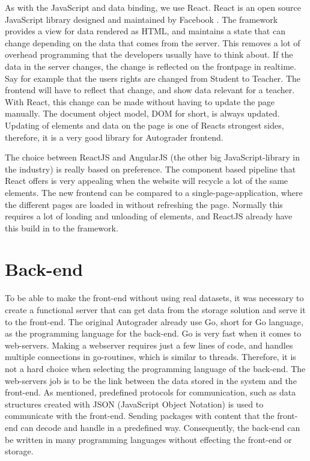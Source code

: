 As with the JavaScript and data binding, we use React. React is an open source JavaScript library designed and maintained by Facebook . The framework provides a view for data rendered as HTML, and maintains a state that can change depending on the data that comes from the server. This removes a lot of overhead programming that the developers usually have to think about. If the data in the server changes, the change is reflected on the frontpage in realtime. Say for example that the users rights are changed from Student to Teacher. The frontend will have to reflect that change, and show data relevant for a teacher. With React, this change can be made without having to update the page manually. The document object model, DOM for short, is always updated. Updating of elements and data on the page is one of Reacts strongest sides, therefore, it is a very good library for Autograder frontend.

The choice between ReactJS and AngularJS (the other big JavaScript-library in the industry) is really based on preference. The component based pipeline that React offers is very appealing when the website will recycle a lot of the same elements. The new frontend can be compared to a single-page-application, where the different pages are loaded in without refreshing the page. Normally this requires a lot of loading and unloading of elements, and ReactJS already have this build in to the framework.

\section{Back-end}
To be able to make the front-end without using real datasets, it was necessary to create a functional server that can get data from the storage solution and serve it to the front-end. The original Autograder already use Go, short for Go language, as the programming language for the back-end. Go is very fast when it comes to web-servers. Making a webserver requires just a few lines of code, and handles multiple connections in go-routines, which is similar to threads. Therefore, it is not a hard choice when selecting the programming language of the back-end. The web-servers job is to be the link between the data stored in the system and the front-end. As mentioned, predefined protocols for communication, such as data structures created with JSON (JavaScript Object Notation) is used to communicate with the front-end. Sending packages with content that the front-end can decode and handle in a predefined way. Consequently, the back-end can be written in many programming languages without effecting the front-end or storage.

